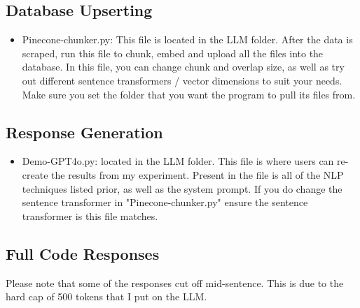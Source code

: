 \documentclass[10pt,twocolumn]{article}
\begin{document}
\subsection{Database Upserting}
\begin{itemize}
    \item Pinecone-chunker.py: This file is located in the LLM folder. After the data is scraped, run this file to chunk, embed and upload all the files into the database. In this file, you can change chunk and overlap size, as well as try out different sentence transformers / vector dimensions to suit your needs. Make sure you set the folder that you want the program to pull its files from.
\end{itemize}

\subsection{Response Generation}
\begin{itemize}
    \item Demo-GPT4o.py: located in the LLM folder. This file is where users can re-create the results from my experiment. Present in the file is all of the NLP techniques listed prior, as well as the system prompt. If you do change the sentence transformer in "Pinecone-chunker.py" ensure the sentence transformer is this file matches.
\end{itemize}

\subsection{Full Code Responses}
Please note that some of the responses cut off mid-sentence. This is due to the hard cap of 500 tokens that I put on the LLM.

\newline
\end{document}
